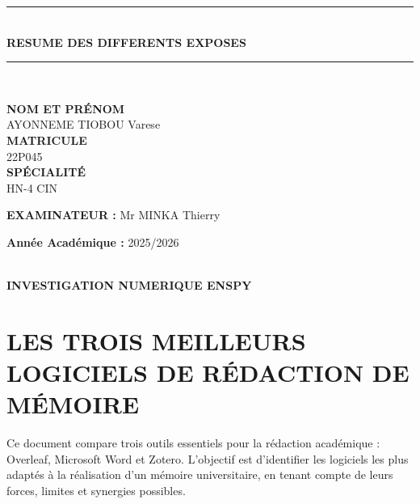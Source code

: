 \documentclass[12pt, a4em]{article}
\begin{document}
\begin{titlepage}
		\vspace{2cm}
		\begin{center}
			\rule{12cm}{1pt} \\[0.4cm]
			{\Large \bfseries RESUME DES DIFFERENTS EXPOSES} \\[0.0001cm] 
			\rule{12cm}{1pt} \\[2cm]
		\end{center}
		
		\begin{center}
			\textbf{NOM ET PRÉNOM}\\
			AYONNEME TIOBOU Varese\\[0.5cm]
			\textbf{MATRICULE}\\
			22P045\\[0.5cm]
			\textbf{SPÉCIALITÉ}\\
			HN-4 CIN
		\end{center}
		
		\vspace{2cm}
		
		\begin{flushleft}
			\textbf{EXAMINATEUR :} Mr MINKA Thierry
		\end{flushleft}
		
		\begin{flushright}
			\textbf{Année Académique :} 2025/2026
		\end{flushright}
		
		\vfill
		
		\begin{center}
			\\[0.05cm]
			\textbf{\color{black}INVESTIGATION NUMERIQUE \hspace{1cm}  \hspace{5cm} ENSPY}
		\end{center}
	\end{titlepage}
	\tableofcontents
	\pagebreak
	
	\section{LES TROIS MEILLEURS LOGICIELS DE RÉDACTION DE MÉMOIRE}
	
	Ce document compare trois outils essentiels pour la rédaction académique : Overleaf, Microsoft Word et Zotero. L'objectif est d'identifier les logiciels les plus adaptés à la réalisation d'un mémoire universitaire, en tenant compte de leurs forces, limites et synergies possibles.
	
\end{document}
